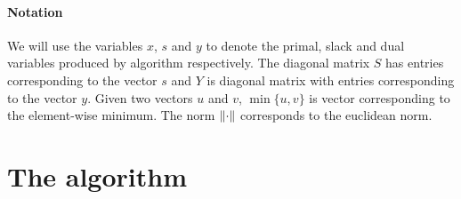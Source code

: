 \documentclass{article}
\begin{document}
\paragraph{Notation} We will use the variables $x$, $s$ and $y$ to denote the primal, slack and dual variables produced by algorithm respectively. The diagonal matrix $S$ has entries corresponding to the vector $s$ and $Y$ is diagonal matrix with entries corresponding to the vector $y$. Given two vectors $u$ and $v$, $\min\{ u, v \}$ is vector corresponding to the element-wise minimum. The norm $\norm{ \cdot }$ corresponds to the euclidean norm.


\section{The algorithm}\label{sec:basic-alg}
\end{document}
